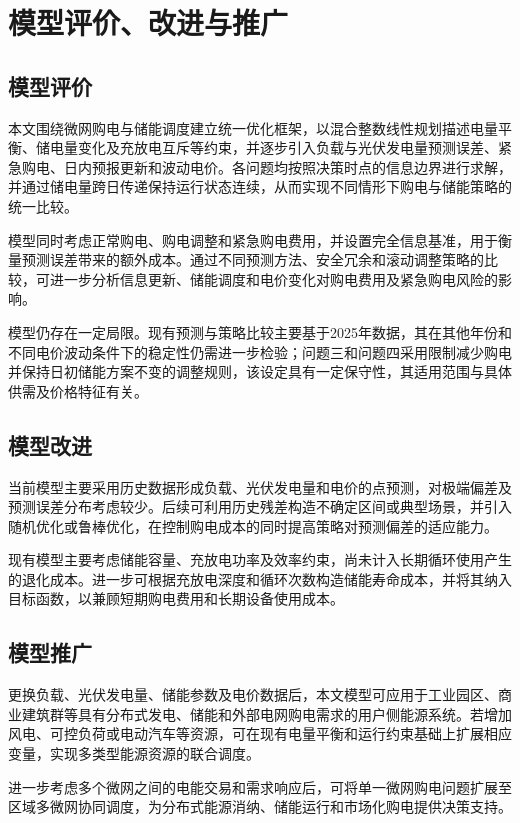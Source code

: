 \section{模型评价、改进与推广}

\subsection{模型评价}

本文围绕微网购电与储能调度建立统一优化框架，以混合整数线性规划描述电量平衡、储电量变化及充放电互斥等约束，并逐步引入负载与光伏发电量预测误差、紧急购电、日内预报更新和波动电价。各问题均按照决策时点的信息边界进行求解，并通过储电量跨日传递保持运行状态连续，从而实现不同情形下购电与储能策略的统一比较。

模型同时考虑正常购电、购电调整和紧急购电费用，并设置完全信息基准，用于衡量预测误差带来的额外成本。通过不同预测方法、安全冗余和滚动调整策略的比较，可进一步分析信息更新、储能调度和电价变化对购电费用及紧急购电风险的影响。

模型仍存在一定局限。现有预测与策略比较主要基于2025年数据，其在其他年份和不同电价波动条件下的稳定性仍需进一步检验；问题三和问题四采用限制减少购电并保持日初储能方案不变的调整规则，该设定具有一定保守性，其适用范围与具体供需及价格特征有关。

\subsection{模型改进}

当前模型主要采用历史数据形成负载、光伏发电量和电价的点预测，对极端偏差及预测误差分布考虑较少。后续可利用历史残差构造不确定区间或典型场景，并引入随机优化或鲁棒优化，在控制购电成本的同时提高策略对预测偏差的适应能力。

现有模型主要考虑储能容量、充放电功率及效率约束，尚未计入长期循环使用产生的退化成本。进一步可根据充放电深度和循环次数构造储能寿命成本，并将其纳入目标函数，以兼顾短期购电费用和长期设备使用成本。

\subsection{模型推广}

更换负载、光伏发电量、储能参数及电价数据后，本文模型可应用于工业园区、商业建筑群等具有分布式发电、储能和外部电网购电需求的用户侧能源系统。若增加风电、可控负荷或电动汽车等资源，可在现有电量平衡和运行约束基础上扩展相应变量，实现多类型能源资源的联合调度。

进一步考虑多个微网之间的电能交易和需求响应后，可将单一微网购电问题扩展至区域多微网协同调度，为分布式能源消纳、储能运行和市场化购电提供决策支持。
